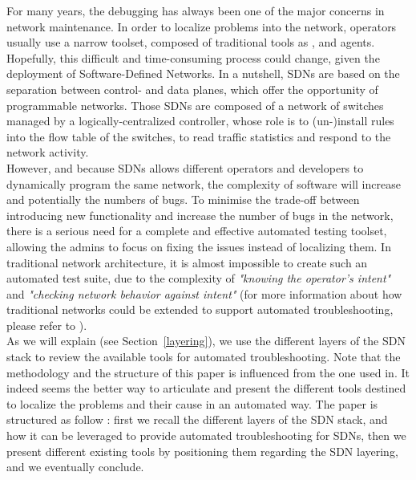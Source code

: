 \documentclass[10pt,article]{IEEEtran}
\begin{document}
For many years, the debugging has always been one of the major concerns in network maintenance. In order to localize problems into the network, operators usually use a narrow toolset, composed of traditional tools as \verb@ping@, \verb@traceroute@ and \verb@SNMP@ agents\cite{zeng2012automatic}.\\
Hopefully, this difficult and time-consuming\cite{zeng2012automatic} process could change, given the deployment of Software-Defined Networks. In a nutshell, SDNs are based on the separation between control- and data planes, which offer the opportunity of programmable networks\cite{mckeown2008openflow}. Those SDNs are composed of a network of switches managed by a logically-centralized controller, whose role is to (un-)install rules into the flow table of the switches, to read traffic statistics and respond to the network activity.\\
However, and because SDNs allows different operators and developers to dynamically program the same network, the complexity of software will increase\cite{Sherwood:2010:PNT:1924943.1924969} and potentially the numbers of bugs.
To minimise the trade-off between introducing new functionality and  increase the number of bugs in the network, there is a serious need for a complete and effective automated testing toolset, allowing the admins to focus on fixing the issues instead of localizing them. In traditional network architecture, it is almost impossible to create such an automated test suite, due to the complexity of \textit{"knowing the operator's intent"} and \textit{"checking network behavior against intent"}\cite{Heller:2013:LSL:2491185.2491197} (for more information about how traditional networks could be extended to support automated troubleshooting, please refer to \cite{Heller:2013:LSL:2491185.2491197}).\\
As we will explain (see Section~\ref{layering}), we use the different layers of the SDN stack to review the available tools for automated troubleshooting. Note that the methodology and the structure of this paper is influenced from the one used in\cite{Heller:2013:LSL:2491185.2491197}. It indeed seems the better way to articulate and present the different tools destined to localize the problems and their cause in an automated way.
The paper is structured as follow : first we recall the different layers of the SDN stack, and how it can be leveraged to provide automated troubleshooting for SDNs, then we present different existing tools by positioning them regarding the SDN layering, and we eventually conclude.
\end{document}
